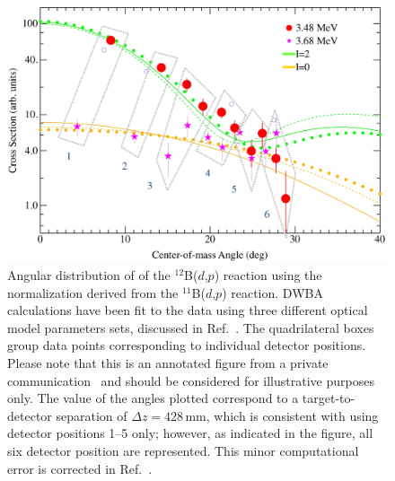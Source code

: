 \begin{figure}[p]
\centering
\includegraphics[height=0.4\textheight,width=\columnwidth,keepaspectratio]{More_Figures/b13.eps}%
\caption[Angular distribution of of the $^{12}$B($d$,$p$) reaction]{Angular distribution of of the $^{12}$B($d$,$p$) reaction using the normalization derived from the $^{11}$B($d$,$p$) reaction.  DWBA calculations have been fit to the data using three different optical model parameters sets, discussed in Ref.~\cite{Schiffer_2010}. The quadrilateral boxes group data points corresponding to individual detector positions.  Please note that this is an annotated figure from a private communication~\cite{Schiffer_2009PC} and should be considered for illustrative purposes only.  The value of the angles plotted correspond to a target-to-detector separation of $\Delta z = 428$\,mm, which is consistent with using detector positions 1--5 only; however, as indicated in the figure, all six detector position are represented. This minor computational error is corrected in Ref.~\cite{Schiffer_2010}.
}%
\label{b13angdist}%
\end{figure}
